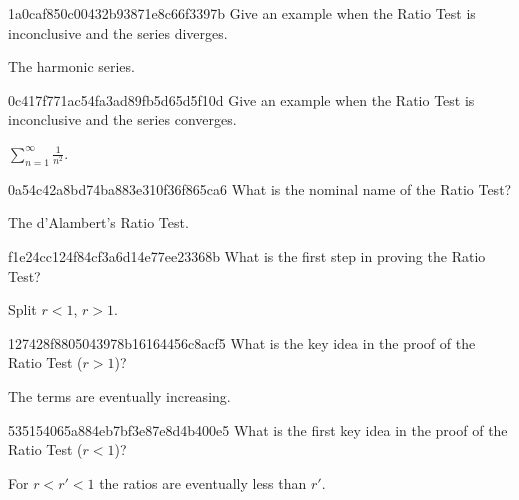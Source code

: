 \begin{note}{1a0caf850c00432b93871e8c66f3397b}
    Give an example when the Ratio Test is inconclusive and the series diverges.

    \begin{cloze}{1}
        The harmonic series.
    \end{cloze}
\end{note}

\begin{note}{0c417f771ac54fa3ad89fb5d65d5f10d}
    Give an example when the Ratio Test is inconclusive and the series converges.

    \begin{cloze}{1}
        \({ \sum_{n=1}^{\infty} \frac{1}{n^2} }\).
    \end{cloze}
\end{note}

\begin{note}{0a54c42a8bd74ba883e310f36f865ca6}
    What is the nominal name of the Ratio Test?

    \begin{cloze}{1}
        The d'Alambert's Ratio Test.
    \end{cloze}
\end{note}

\begin{note}{f1e24cc124f84cf3a6d14e77ee23368b}
    What is the first step in proving the Ratio Test?

    \begin{cloze}{1}
        Split \({ r < 1 }\), \({ r > 1 }\).
    \end{cloze}
\end{note}

\begin{note}{127428f8805043978b16164456c8acf5}
    What is the key idea in the proof of the Ratio Test (\({ r > 1 }\))?

    \begin{cloze}{1}
        The terms are eventually increasing.
    \end{cloze}
\end{note}

\begin{note}{535154065a884eb7bf3e87e8d4b400e5}
    What is the first key idea in the proof of the Ratio Test (\({ r < 1 }\))?

    \begin{cloze}{1}
        For \({ r < r' < 1 }\) the ratios are eventually less than \({ r' }\).
    \end{cloze}
\end{note}

